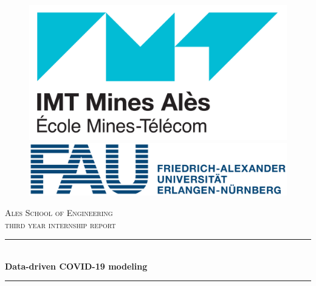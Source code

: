 \documentclass[12pt, letterpaper]{article}
\newcommand{\HRule}{\rule{\linewidth}{0.5mm}}
\begin{document}
\begin{titlepage}
  \begin{sffamily}
  \begin{center}
  
  \begin{figure}
\centering
\begin{minipage}{.5\textwidth}
  \centering
  \includegraphics[scale=0.27]{imt_mines_ales.jpg}
\end{minipage}%
\begin{minipage}{.5\textwidth}

  \centering
  \includegraphics[scale=0.15]{fau-logo.png}
\end{minipage}
\end{figure}

    \textsc{\LARGE Ales School of Engineering}\\[2cm]

    \textsc{\Large third year internship report}\\[1.5cm]

    \HRule \\[0.4cm]
    { \huge \bfseries Data-driven COVID-19 modeling\\[0.4cm] }

    \HRule \\[4cm]


\end{center}
\end{sffamily}
\end{titlepage}
\end{document}
